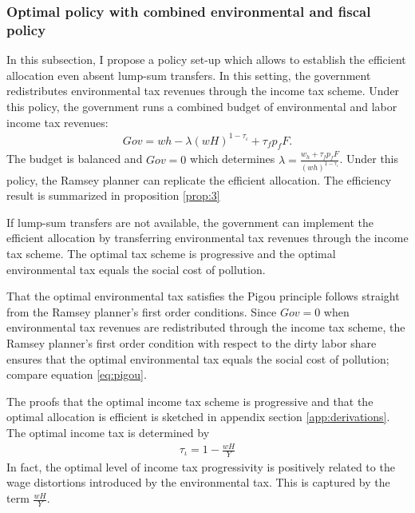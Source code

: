  

 

\subsubsection{Optimal policy with combined environmental and fiscal policy}

In this subsection, I propose a policy set-up which allows to establish the efficient allocation even absent lump-sum transfers. In this setting, the government redistributes environmental tax revenues through the income tax scheme.
Under this policy, the government runs a combined budget of environmental and labor income tax revenues:  
\begin{align}
Gov= wh-\lambda (wH)^{1-\tau_\iota}+\tau_f p_fF.
\end{align}
The budget is balanced and $Gov = 0$ which determines $\lambda=\frac{w_h + \tau_f p_f F}{(wh)^{1-\tau_{\iota}}}$. 
Under this policy, the Ramsey planner can replicate the efficient allocation. 
The efficiency result is summarized in proposition \ref{prop:3}

\begin{prop}\label{prop:3}
	If lump-sum transfers are not available, the government can implement the efficient allocation by  transferring environmental tax revenues through the income tax scheme. The optimal tax scheme is progressive and the optimal environmental tax equals the social cost of pollution.
\end{prop}

	That the optimal environmental tax satisfies the Pigou principle follows straight from the Ramsey planner's first order conditions. Since $Gov=0$ when environmental tax revenues are redistributed through the income tax scheme, the Ramsey planner's first order condition with respect to the dirty labor share ensures that the optimal environmental tax equals the social cost of pollution; compare equation \ref{eq:pigou}. 
	
	The proofs that the optimal income tax scheme is progressive and that the optimal allocation is efficient is sketched in appendix section \ref{app:derivations}.
The optimal income tax is determined by
\begin{align}
\tau_\iota=1-\frac{wH}{Y}
\end{align}
In fact, the optimal level of income tax progressivity is positively related to the wage distortions introduced by the environmental tax. This is captured by the term $\frac{wH}{Y}$. 


